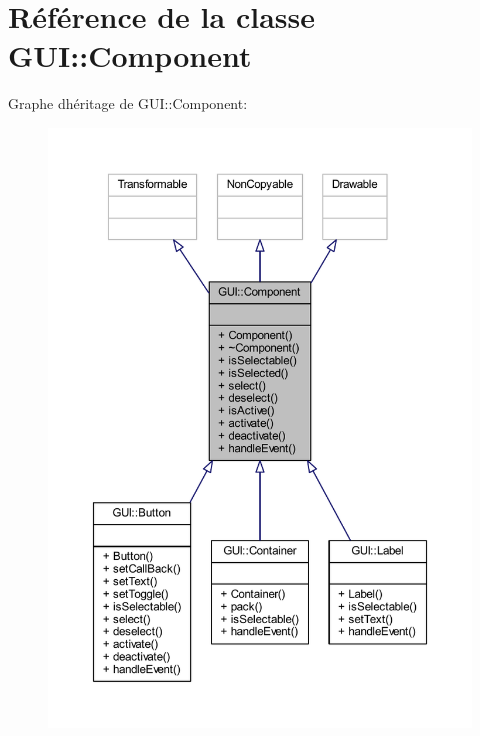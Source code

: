 \hypertarget{class_g_u_i_1_1_component}{}\section{Référence de la classe G\+UI\+:\+:Component}
\label{class_g_u_i_1_1_component}


Graphe d\textquotesingle{}héritage de G\+UI\+:\+:Component\+:\nopagebreak
\begin{figure}[H]
\begin{center}
\leavevmode
\includegraphics[width=350pt]{class_g_u_i_1_1_component__inherit__graph}
\end{center}
\end{figure}


